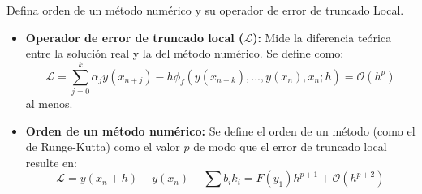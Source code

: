 \vspace{0.5cm}

\begin{ejer}[4]
Defina orden de un método numérico y su operador de error de truncado Local.
\end{ejer}
\begin{sol}
\begin{itemize}
    \item \textbf{Operador de error de truncado local ($\mathscr L$):} Mide la diferencia teórica entre la solución real y la del método numérico. Se define como:
    $$\mathscr L = \sum_{j=0}^{k}\alpha_{j}y(x_{n+j}) - h\phi_{f}(y(x_{n+k}),...,y(x_{n}),x_{n};h) = \mathcal{O}(h^{p})$$
    al menos.
    \item \textbf{Orden de un método numérico:} Se define el orden de un método (como el de Runge-Kutta) como el valor $p$ de modo que el error de truncado local resulte en:
    $$\mathscr L = y(x_n + h) - y(x_n) - \sum b_i k_i = F(y_1)h^{p+1} + \mathcal{O}(h^{p+2})$$
\end{itemize}
\end{sol}

